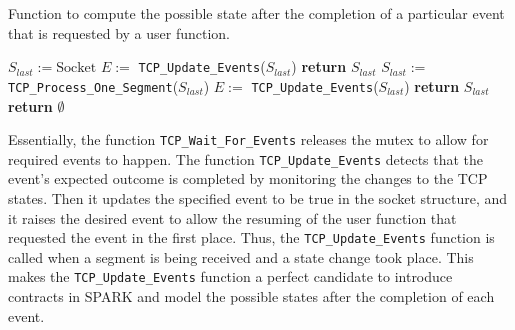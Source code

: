 \documentclass[conference]{IEEEtran}
\def\spark#1{\lstinline[language=Ada]{#1}}
\begin{document}
\begin{algorithm}[t]
    \caption{Function to compute the possible state after the completion of a
particular event that is requested by a user function.}
\label{algo:waitForEvents}
\begin{algorithmic}[1]
\footnotesize
{}
    \State $S_{last} := \text{Socket}$
    \State $E :=$ \spark{TCP_Update_Events}($S_{last}$)
        \State \textbf{return}  $S_{last}$
    \EndIf
        \State $S_{last} :=$ \spark{TCP_Process_One_Segment}($S_{last}$)
        \State $E :=$ \spark{TCP_Update_Events}($S_{last}$)
            \State \textbf{return} $S_{last}$
        \EndIf
    \EndFor
    \State \textbf{return} $\emptyset$
\EndFunction
\end{algorithmic}
\end{algorithm}



Essentially, the function \spark{TCP_Wait_For_Events} releases the mutex to allow for required events to happen. The function \spark{TCP_Update_Events} detects that the event's expected outcome is completed by monitoring the changes to the TCP states. Then it updates the specified event to be true in the socket structure, and it raises the desired event to allow the resuming of the user function that requested the event in the first place. Thus, the \spark{TCP_Update_Events} function is called when a segment is being received and a state change took place. This makes the \spark{TCP_Update_Events} function a perfect candidate to introduce contracts in SPARK and model the possible states after the completion of each event.
\end{document}
